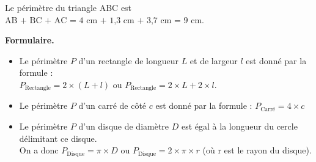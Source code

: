 \begin{Exemple}
\vspace{-0.3cm}
\begin{minipage}{0.55\textwidth}
Le périmètre du triangle ABC est  \\
$\text{AB + BC + AC = 4 cm + 1,3 cm + 3,7 cm = 9 cm}$.
\end{minipage} \hfill
\begin{minipage}{0.4\textwidth}
\begin{center}
\end{center}
\end{minipage} 

\end{Exemple}


\begin{Propriété}[c] \textbf{Formulaire.}
\begin{itemize}[label=\textcolor{Couleur1}{$\bullet$}]
\item Le périmètre $P$ d'un rectangle de longueur $L$ et de largeur $l$ est donné par la formule :\\
 $P_{\text{Rectangle}} = 2 \times (L + l)$ ou $P_{\text{Rectangle}} = 2 \times L + 2 \times l$.

\item Le périmètre $P$ d'un carré de côté $c$ est donné par la formule :  $P_{\text{Carré}}=4 \times c$

\item Le périmètre $P$ d'un disque de diamètre $D$ est égal à la longueur du cercle délimitant ce disque. \\
On a donc $P_{\text{Disque}} = \pi \times D$  ou $P_{\text{Disque}} = 2 \times \pi \times r$ (où r est le rayon du disque).
\end{itemize}
\end{Propriété}

